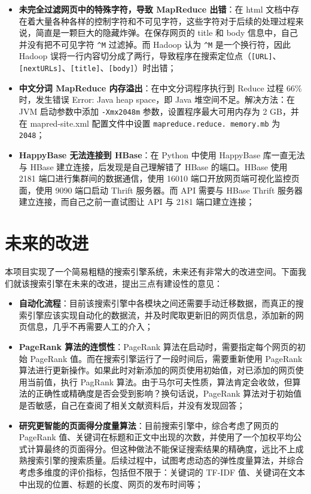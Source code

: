 \documentclass{ctexart}
\newcommand{\code}[1]{\colorbox{backcolor}{\lstinline|#1|}}
\begin{document}
    \begin{itemize}
        \item \textbf{未完全过滤网页中的特殊字符，导致 MapReduce 出错}：在 html 文档中存在着大量各种各样的控制字符和不可见字符，这些字符对于后续的处理过程来说，简直是一颗巨大的隐藏炸弹。在保存网页的 title 和 body 信息中，自己并没有把不可见字符 \code{^M} 过滤掉。而 Hadoop 认为 \code{^M} 是一个换行符，因此 Hadoop 误将一行内容切分成了两行，导致程序在搜索定位点（\code{[URL]}、\code{[nextURLs]}、\code{[title]}、\code{[body]}）时出错；
        \item \textbf{中文分词 MapReduce 内存溢出}：在中文分词程序执行到 Reduce 过程 66\% 时，发生错误 Error: Java heap space，即 Java 堆空间不足。解决方法：在 JVM 启动参数中添加 \code{-Xmx2048m} 参数，设置程序最大可用内存为 2 GB，并在 mapred-site.xml 配置文件中设置 \code{mapreduce.reduce. memory.mb} 为 \code{2048}；
        \item \textbf{HappyBase 无法连接到 HBase}：在 Python 中使用 HappyBase 库一直无法与 HBase 建立连接，后发现是自己理解错了 HBase 的端口。HBase 使用 2181 端口进行集群间的数据通信，使用 16010 端口开放网页端可视化监控页面，使用 9090 端口启动 Thrift 服务器。而 API 需要与 HBase Thrift 服务器建立连接，而自己之前一直试图让 API 与 2181 端口建立连接；
    \end{itemize}


    \section{未来的改进}\label{sec:improvement}

    本项目实现了一个简易粗糙的搜索引擎系统，未来还有非常大的改进空间。下面我们就该搜索引擎在未来的改进，提出三点有建设性的意见：

    \begin{itemize}
        \item \textbf{自动化流程}：目前该搜索引擎中各模块之间还需要手动迁移数据，而真正的搜索引擎应该实现自动化的数据流，并及时爬取更新旧的网页信息，添加新的网页信息，几乎不再需要人工的介入；
        \item \textbf{PageRank 算法的连惯性}：PageRank 算法在启动时，需要指定每个网页的初始 PageRank 值。而在搜索引擎运行了一段时间后，需要重新使用 PageRank 算法进行更新操作。如果此时对新添加的网页使用初始值，对已添加的网页使用当前值，执行 PagRank 算法。由于马尔可夫性质，算法肯定会收敛，但算法的正确性或精确度是否会受到影响？换句话说，PageRank 算法对于初始值是否敏感，自己在查阅了相关文献资料后，并没有发现回答；
        \item \textbf{研究更智能的页面得分度量算法}：目前搜索引擎中，综合考虑了网页的 PageRank 值、关键词在标题和正文中出现的次数，并使用了一个加权平均公式计算最终的页面得分。但这种做法不能保证搜索结果的精确度，远比不上成熟搜索引擎的搜索质量。后续过程中，试图考虑动态的弹性度量算法，并综合考虑多维度的评价指标，包括但不限于：关键词的 TF-IDF 值、关键词在文本中出现的位置、标题的长度、网页的发布时间等；
    \end{itemize}
\end{document}
